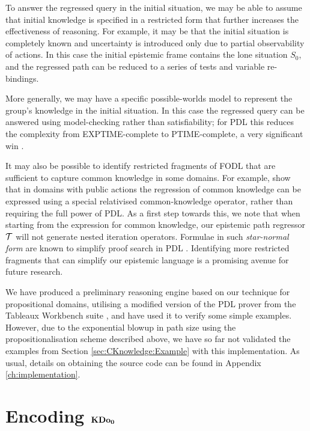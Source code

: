 To answer the regressed query in the initial situation, we may be
able to assume that initial knowledge is specified in a restricted
form that further increases the effectiveness of reasoning. For example,
it may be that the initial situation is completely known and uncertainty
is introduced only due to partial observability of actions. In this
case the initial epistemic frame contains the lone situation $S_{0}$,
and the regressed path can be reduced to a series of tests and variable
re-bindings.

More generally, we may have a specific possible-worlds model to represent
the group's knowledge in the initial situation. In this case the regressed
query can be answered using model-checking rather than satisfiability;
for PDL this reduces the complexity from EXPTIME-complete to PTIME-complete,
a very significant win \citep{lange05pdl_model_checking}.

It may also be possible to identify restricted fragments of FODL that
are sufficient to capture common knowledge in some domains. For example,
\citet{vanBenthem06lcc} show that in domains with public actions
the regression of common knowledge can be expressed using a special
relativised common-knowledge operator, rather than requiring the full
power of PDL. As a first step towards this, we note that when starting
from the expression for common knowledge, our epistemic path regressor
$\mathcal{T}$ will not generate nested iteration operators. Formulae in
such \emph{star-normal form} are known to simplify proof search in
PDL \citep{abate07twb_pdl}. Identifying more restricted fragments
that can simplify our epistemic language is a promising avenue for
future research.

We have produced a preliminary reasoning engine based on our technique
for propositional domains, utilising a modified version of the PDL
prover from the Tableaux Workbench suite \citep{abate07twb_pdl},
and have used it to verify some simple examples. However, due to the
exponential blowup in path size using the propositionalisation scheme
described above, we have so far not validated the examples from Section
\ref{sec:CKnowledge:Example} with this implementation. As usual,
details on obtaining the source code can be found in Appendix \ref{ch:implementation}.


\section{Encoding $\mathbf{KDo_{0}}$\label{sec:CKnowledge:Encoding-KDoZ}}

